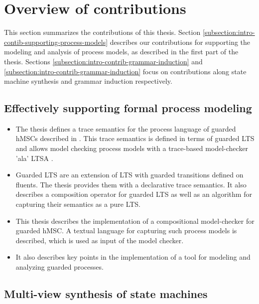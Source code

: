\section{Overview of contributions\label{section:intro-contributions}}

This section summarizes the contributions of this thesis. Section \ref{subsection:intro-contib-supporting-process-models} describes our contributions for supporting the modeling and analysis of process models, as described in the first part of the thesis. Sections \ref{subsection:intro-contrib-grammar-induction} and \ref{subsection:intro-contrib-grammar-induction} focus on contributions along state machine synthesis and grammar induction respectively. 


\subsection{Effectively supporting formal process modeling\label{subsection:intro-contib-supporting-process-models}}

\begin{itemize}

\item The thesis defines a trace semantics for the process language of guarded hMSCs described in \cite{Damas:2011}. This trace semantics is defined in terms of guarded LTS and allows model checking process models with a trace-based model-checker 'ala' LTSA \cite{Magee:1999}. 

\item Guarded LTS are an extension of LTS with guarded transitions defined on fluents. The thesis provides them with a declarative trace semantics. It also describes a composition operator for guarded LTS as well as an algorithm for capturing their semantics as a pure LTS.

\item This thesis describes the implementation of a compositional model-checker for guarded hMSC. A textual language for capturing such process models is described, which is used as input of the model checker.

\item It also describes key points in the implementation of a tool for modeling and analyzing guarded processes. 

\end{itemize}


\subsection{Multi-view synthesis of state machines\label{subsection:intro-contrib-inductive-synthesis}}

